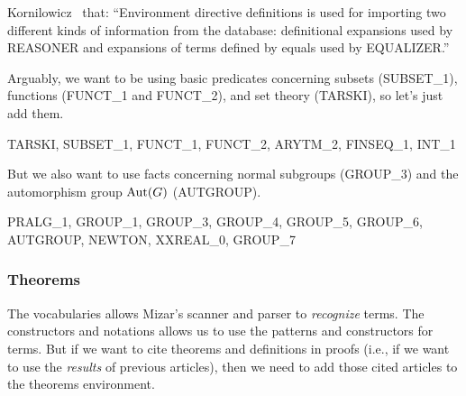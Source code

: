 \begin{remark}
  Kornilowicz~\cite[see \S{5.1}]{kornilowicz2015definitional} that:
  ``Environment directive {\Tt{}definitions\nwendquote} is used for importing two different kinds of information from the database: definitional expansions used by REASONER and expansions of terms defined by equals used by EQUALIZER.''
\end{remark}

Arguably, we want to be using basic predicates concerning subsets
({\Tt{}SUBSET{\_}1\nwendquote}), functions ({\Tt{}FUNCT{\_}1\nwendquote} and {\Tt{}FUNCT{\_}2\nwendquote}), and set theory
({\Tt{}TARSKI\nwendquote}), so let's just add them.

\nwenddocs{}\endmoddef\nwstartdeflinemarkup{}\nwenddeflinemarkup
TARSKI, SUBSET_1, FUNCT_1, FUNCT_2, ARYTM_2, FINSEQ_1, INT_1
\nwendcode{}\nwdocspar

But we also want to use facts concerning normal subgroups ({\Tt{}GROUP{\_}3\nwendquote})
and the automorphism group $\operatorname{Aut}(G)$ ({\Tt{}AUTGROUP\nwendquote}).

\nwenddocs{}\endmoddef\nwstartdeflinemarkup{}\nwenddeflinemarkup
PRALG_1, GROUP_1, GROUP_3, GROUP_4, GROUP_5, GROUP_6, AUTGROUP, NEWTON,
XXREAL_0, GROUP_7
\nwendcode{}\nwdocspar

\subsubsection{Theorems}
The {\Tt{}vocabularies\nwendquote} allows Mizar's scanner and parser to
\emph{recognize} terms. The {\Tt{}constructors\nwendquote} and {\Tt{}notations\nwendquote} allows us
to use the patterns and constructors for terms. But if we want to cite
theorems and definitions in proofs (i.e., if we want to use the
\emph{results} of previous articles), then we need to add those cited
articles to the {\Tt{}theorems\nwendquote} environment.

